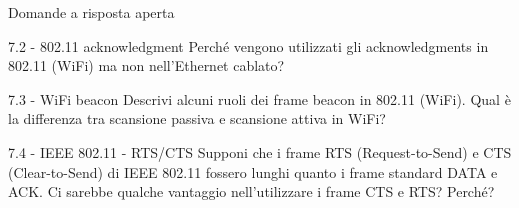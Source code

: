 \documentclass[a4paper]{article}
\begin{document}
\begin{quiz}{Domande a risposta aperta}
\begin{essay}[points=1]{7.2 - 802.11 acknowledgment}
Perché vengono utilizzati gli acknowledgments in 802.11 (WiFi) ma non nell'Ethernet cablato?
\end{essay}

\begin{essay}[points=1]{7.3 - WiFi beacon}
Descrivi alcuni ruoli dei frame beacon in 802.11 (WiFi). Qual è la differenza tra scansione passiva e scansione attiva in WiFi?
\end{essay}

\begin{essay}[points=1]{7.4 - IEEE 802.11 - RTS/CTS}
Supponi che i frame RTS (Request-to-Send) e CTS (Clear-to-Send) di IEEE 802.11 fossero lunghi quanto i frame standard DATA e ACK. Ci sarebbe qualche vantaggio nell'utilizzare i frame CTS e RTS? Perché?
\end{essay}

\end{quiz}
\end{document}
